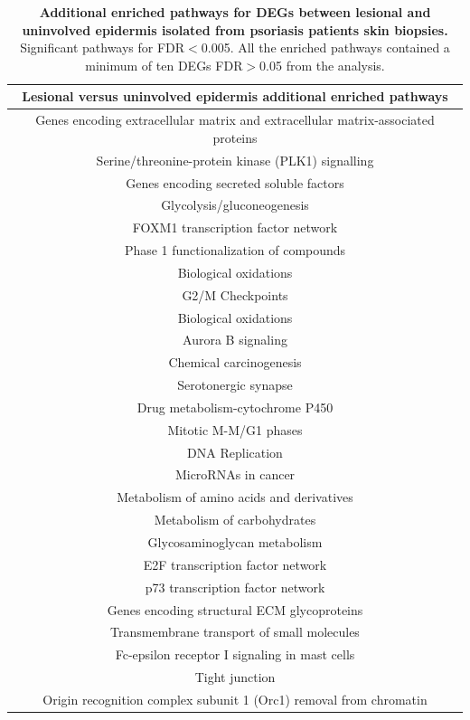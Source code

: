 \begin{table}[htbp]
\centering
\begin{tabular}{@{} c }
\toprule
\textbf{Lesional versus uninvolved epidermis additional enriched pathways} \\
\midrule
\midrule
Genes encoding extracellular matrix and extracellular matrix-associated proteins \\ 
Serine/threonine-protein kinase (PLK1) signalling \\
Genes encoding secreted soluble factors \\
Glycolysis/gluconeogenesis \\
FOXM1 transcription factor network \\
Phase 1 functionalization of compounds \\
Biological oxidations \\
G2/M Checkpoints \\
Biological oxidations \\
Aurora B signaling \\
Chemical carcinogenesis \\
Serotonergic synapse \\
Drug metabolism-cytochrome P450 \\
Mitotic M-M/G1 phases \\
DNA Replication \\
MicroRNAs in cancer \\
Metabolism of amino acids and derivatives \\
Metabolism of carbohydrates \\
Glycosaminoglycan metabolism \\
E2F transcription factor network \\
p73 transcription factor network \\
Genes encoding structural ECM glycoproteins \\
Transmembrane transport of small molecules \\
Fc-epsilon receptor I signaling in mast cells \\
Tight junction \\
Origin recognition complex subunit 1 (Orc1) removal from chromatin \\
\bottomrule
\end{tabular}
\medskip %
\caption[Additional enriched pathways for DEGs between lesional and uninvolved epidermis isolated from psoriasis patients skin biopsies.]{\textbf{Additional enriched pathways for DEGs between lesional and uninvolved epidermis isolated from psoriasis patients skin biopsies.} Significant pathways for FDR$<$0.005. All the enriched pathways contained a minimum of ten DEGs FDR$>$0.05 from the analysis.}
\label{tab:RNAseq_PS_lesional_uninvolved_additional_pathways}
\end{table}




